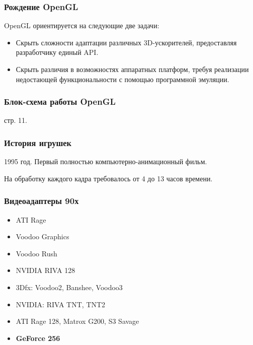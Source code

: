 \documentclass[10pt]{beamer}
\begin{document}
\begin{frame}\frametitle{Рождение OpenGL}
{

	
		OpenGL ориентируется на следующие две задачи:
	\begin{itemize}
		\item Скрыть сложности адаптации различных 3D-ускорителей, предоставляя разработчику единый API.
		\item 	Скрыть различия в возможностях аппаратных платформ, требуя реализации недостающей функциональности с помощью программной эмуляции.
	\end{itemize}
}\end{frame}


\begin{frame}\frametitle{Блок-схема работы OpenGL}
{
	
	\vspace{-1.5em}
	
	\footnotesize {} стр. 11.
}\end{frame}

\begin{frame}\frametitle{История игрушек}
{
		{
		}
		{
			1995 год. Первый полностью компьютерно-анимационный фильм.
			
			На обработку каждого кадра требовалось от 4 до 13 часов времени.
			
			\hfill
			
		} 
}\end{frame}

\begin{frame}\frametitle{Видеоадаптеры 90х}
{
	{
			\begin{itemize}
			
			\item ATI Rage
			\item Voodoo Graphics
			\item Voodoo Rush
			\item NVIDIA RIVA 128
			\item 3Dfx: Voodoo2, Banshee, Voodoo3
			\item NVIDIA: RIVA TNT, TNT2
			\item ATI Rage 128, Matrox G200, S3 Savage
			\item \textbf{GeForce 256}
			
		\end{itemize}
	}
	{
	}

}\end{frame}
\end{document}
